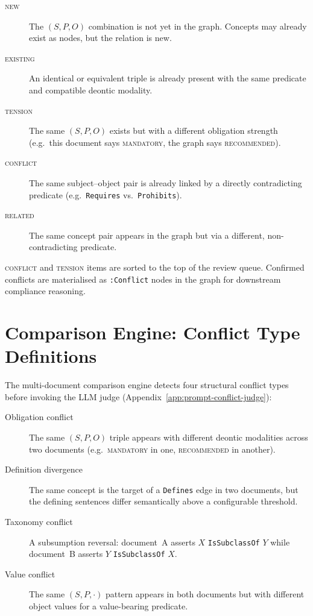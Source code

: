 \begin{description}
  \item[\textsc{new}] The $(S, P, O)$ combination is not yet in the
    graph.  Concepts may already exist as nodes, but the relation is new.
  \item[\textsc{existing}] An identical or equivalent triple is already
    present with the same predicate and compatible deontic modality.
  \item[\textsc{tension}] The same $(S, P, O)$ exists but with a
    different obligation strength (e.g.\ this document says
    \textsc{mandatory}, the graph says \textsc{recommended}).
  \item[\textsc{conflict}] The same subject–object pair is already linked
    by a directly contradicting predicate (e.g.\ \texttt{Requires}
    vs.\ \texttt{Prohibits}).
  \item[\textsc{related}] The same concept pair appears in the graph but
    via a different, non-contradicting predicate.
\end{description}

\textsc{conflict} and \textsc{tension} items are sorted to the top of
the review queue.  Confirmed conflicts are materialised as
\texttt{:Conflict} nodes in the graph for downstream compliance
reasoning.

\section{Comparison Engine: Conflict Type Definitions}
\label{app:conflict-types}

The multi-document comparison engine detects four structural conflict
types before invoking the LLM judge (Appendix~\ref{app:prompt-conflict-judge}):

\begin{description}
  \item[Obligation conflict] The same $(S, P, O)$ triple appears with
    different deontic modalities across two documents
    (e.g.\ \textsc{mandatory} in one, \textsc{recommended} in another).
  \item[Definition divergence] The same concept is the target of a
    \texttt{Defines} edge in two documents, but the defining sentences
    differ semantically above a configurable threshold.
  \item[Taxonomy conflict] A subsumption reversal: document~A asserts
    $X$ \texttt{IsSubclassOf} $Y$ while document~B asserts $Y$
    \texttt{IsSubclassOf} $X$.
  \item[Value conflict] The same $(S, P, \cdot)$ pattern appears in
    both documents but with different object values for a
    value-bearing predicate.
\end{description}

